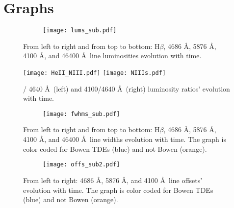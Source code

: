 \documentclass[structabstract]{aa}
\begin{document}
\section{Graphs} \label{apdx:graphs}

\begin{figure*}[h]
        \centering
        \begin{subfigure}[b]{1\textwidth}
            \centering
            \texttt{[image: lums\_sub.pdf]}
        \end{subfigure}
        \caption
        {From left to right and from top to bottom: H$\beta$,  4686 \AA,  5876 \AA,  4100 \AA, and  46400 \AA\, line luminosities evolution with time.} 
        \label{fig:lums_sub}
    \end{figure*}
    
    
    
\begin{figure}
\centering
\texttt{[image: HeII\_NIII.pdf]}
\texttt{[image: NIIIs.pdf]}
\caption{/ 4640 \AA\, (left) and  4100/4640 \AA\, (right) luminosity ratios' evolution with time.}
\label{fig:HeII_NIIIs}
\end{figure}
    
    
\begin{figure*}
        \centering
        \begin{subfigure}[b]{1\textwidth}
            \centering
            \texttt{[image: fwhms\_sub.pdf]}
        \end{subfigure}
        \caption
        {From left to right and from top to bottom: H$\beta$,  4686 \AA,  5876 \AA,  4100 \AA, and  46400 \AA\, line widths evolution with time. The graph is color coded for Bowen  TDEs (blue) and not Bowen (orange).} 
        \label{fig:fwhms_sub}
    \end{figure*}

\begin{figure*}
        \centering
        \begin{subfigure}[b]{1\textwidth}
            \centering
            \texttt{[image: offs\_sub2.pdf]}
        \end{subfigure}
        \caption
        {From left to right:  4686 \AA,  5876 \AA, and  4100 \AA\, line offsets' evolution with time. The graph is color coded for Bowen  TDEs (blue) and not Bowen (orange).} 
        \label{fig:offs_sub}
    \end{figure*}
\end{document}

